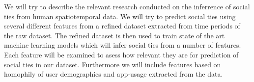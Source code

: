 We will try to describe the relevant research conducted on the inferrence of social ties from human spatiotemporal data. We will try to predict social ties using several different features from a refined dataset extracted from time periods of the raw dataset. The refined dataset is then used to train state of the art machine learning models which will infer social ties from a number of features. Each feature will be examined to asess how relevant they are for prediction of social ties in our dataset. Furthermore we will include features based on homophily of user demographics and app-usage extracted from the data.

